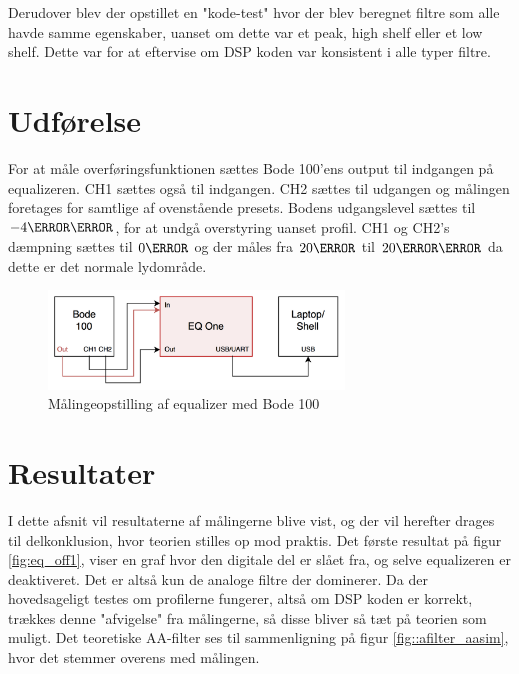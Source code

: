 Derudover blev der opstillet en "kode-test" hvor der blev beregnet filtre som alle havde samme egenskaber, uanset om dette var et peak, high shelf eller et low shelf. Dette var for at eftervise om DSP koden var konsistent i alle typer filtre. \\

\section{Udførelse}
For at måle overføringsfunktionen sættes Bode 100'ens output til indgangen på equalizeren. CH1 sættes også til indgangen. CH2 sættes til udgangen og målingen foretages for samtlige af ovenstående presets. Bodens udgangslevel sættes til $-4\decibel\milli$, for at undgå overstyring uanset profil. CH1 og CH2's dæmpning sættes til $0\decibel$ og der måles fra $20\hertz$ til $20\kilo\hertz$ da dette er det normale lydområde.\\


\begin{figure}[h!]\label{fig:bode_setup}
	\centering
	\includegraphics[width=0.7\textwidth]{billeder/bode_setup}
	\caption{Målingeopstilling af equalizer med Bode 100}
\end{figure}	

\FloatBlock

\section{Resultater}
I dette afsnit vil resultaterne af målingerne blive vist, og der vil herefter drages til delkonklusion, hvor teorien stilles op mod praktis.
Det første resultat på figur \ref{fig:eq_off1}, viser en graf hvor den digitale del er slået fra, og selve equalizeren er deaktiveret. Det er altså kun de analoge filtre der dominerer. Da der hovedsageligt testes om profilerne fungerer, altså om DSP koden er korrekt, trækkes denne "afvigelse" fra målingerne, så disse bliver så tæt på teorien som muligt. Det teoretiske AA-filter ses til sammenligning på figur \ref{fig::afilter_aasim}, hvor det stemmer overens med målingen.

